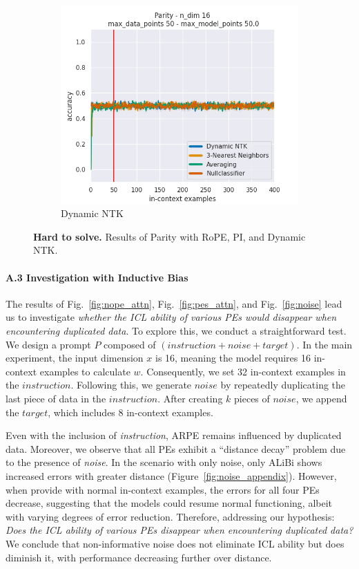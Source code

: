 \documentclass[letterpaper]{article} %
\begin{document}
\begin{figure}[tp]
    \begin{subfigure}[t]{0.32\linewidth}
        \includegraphics[width=\linewidth]{AnonymousSubmission/LaTeX/imgs/appendix/parity/ntk.png}
        \caption{Dynamic NTK}
    \end{subfigure}
    \caption{\small\textbf{Hard to solve.} Results of Parity with RoPE, PI, and Dynamic NTK.}
    \label{fig:hard_appendix}
\end{figure}

\paragraph{A.3 Investigation with Inductive Bias}
The results of Fig.~\ref{fig:nope_attn}, Fig.~\ref{fig:pes_attn}, and Fig.~\ref{fig:noise} lead us to investigate \textit{whether the ICL ability of various PEs would disappear when encountering duplicated data}. To explore this, we conduct a straightforward test. We design a prompt $P$ composed of $(instruction + noise + target)$. In the main experiment, the input dimension $x$ is 16, meaning the model requires 16 in-context examples to calculate $w$. Consequently, we set 32 in-context examples in the $instruction$. Following this, we generate $noise$ by repeatedly duplicating the last piece of data in the $instruction$. After creating $k$ pieces of $noise$, we append the $target$, which includes 8 in-context examples.

Even with the inclusion of \textit{instruction}, ARPE remains influenced by duplicated data. Moreover, we observe that all PEs exhibit a ``distance decay'' problem due to the presence of \textit{noise}. In the scenario with only noise, only ALiBi shows increased errors with greater distance (Figure~\ref{fig:noise_appendix}). However, when provide with normal in-context examples, the errors for all four PEs decrease, suggesting that the models could resume normal functioning, albeit with varying degrees of error reduction. Therefore, addressing our hypothesis: \textit{Does the ICL ability of various PEs disappear when encountering duplicated data?} We conclude that non-informative noise does not eliminate ICL ability but does diminish it, with performance decreasing further over distance.
\end{document}
